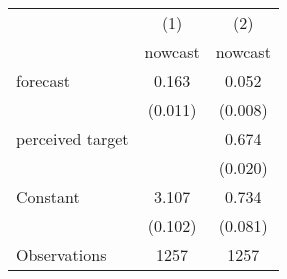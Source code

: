 \begin{tabular}{l*{2}{c}}
\hline\hline
                    &\multicolumn{1}{c}{(1)}&\multicolumn{1}{c}{(2)}\\
                    &\multicolumn{1}{c}{nowcast}&\multicolumn{1}{c}{nowcast}\\
\hline
forecast            &       0.163&       0.052\\
                    &     (0.011)&     (0.008)\\
[1em]
perceived target    &            &       0.674\\
                    &            &     (0.020)\\
[1em]
Constant            &       3.107&       0.734\\
                    &     (0.102)&     (0.081)\\
\hline
Observations        &        1257&        1257\\
\hline\hline
\end{tabular}
